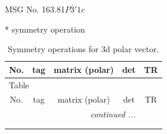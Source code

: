 \documentclass[fleqn,8pt]{jsarticle}
\begin{document}
\setcounter{MaxMatrixCols}{32}

\renewcommand{\tablename}{Table~}
\renewcommand{\figurename}{Figure~}
\begin{center}
\LARGE
MSG No. 163.81\quad$P\bar{3}'1c$
\end{center}
* symmetry operation
\renewcommand{\arraystretch}{1.3}
\begin{longtable}{ccccc}
\caption{Symmetry operations for 3d polar vector.}
 \\
 \hline \hline
No. & tag & matrix (polar) & det & TR \\ \hline \endfirsthead

\multicolumn{4}{l}{\tablename\ \thetable{}} \\
 \hline \hline
No. & tag & matrix (polar) & det & TR \\ \hline \endhead

 \hline \hline
\multicolumn{4}{r}{\footnotesize\it continued ...} \\ \endfoot

 \hline \hline
\multicolumn{4}{r}{} \\ \endlastfoot


\end{longtable}
\end{document}
